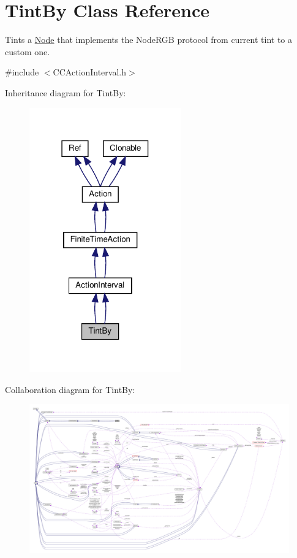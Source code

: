 \hypertarget{classTintBy}{}\section{Tint\+By Class Reference}
\label{classTintBy}


Tints a \hyperlink{classNode}{Node} that implements the Node\+R\+GB protocol from current tint to a custom one.  




{\ttfamily \#include $<$C\+C\+Action\+Interval.\+h$>$}



Inheritance diagram for Tint\+By\+:
\nopagebreak
\begin{figure}[H]
\begin{center}
\leavevmode
\includegraphics[width=186pt]{classTintBy__inherit__graph}
\end{center}
\end{figure}


Collaboration diagram for Tint\+By\+:
\nopagebreak
\begin{figure}[H]
\begin{center}
\leavevmode
\includegraphics[width=350pt]{classTintBy__coll__graph}
\end{center}
\end{figure}
